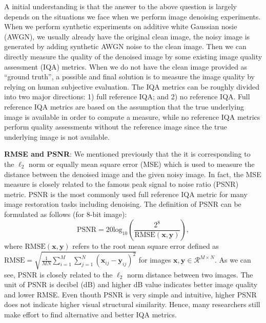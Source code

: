 A initial understanding is that the answer to the above question is largely depends on the situations we face when we perform image denoising experiments. When we perform synthetic experiments on additive white Gaussian nosie (AWGN), we usually already have the original clean image, the noisy image is generated by adding synthetic AWGN noise to the clean image. Then we can directly measure the quality of the denoised image by some existing image quality assessment (IQA) metrics. When we do not have the clean image provided as ``ground truth'', a possible and final solution is to measure the image quality by relying on human subjective evaluation. The IQA metrics can be roughly divided into two major directions: 1) full reference IQA; and 2) no reference IQA. Full reference IQA metrics are based on the assumption that the true underlying image is available in order to compute a measure, while no reference IQA metrics perform quality assessments without the reference image since the true underlying image is not available. 

\textbf{RMSE and PSNR}: We mentioned previously that the it is corresponding to the $\ell_{2}$ norm or equally mean square error (MSE) which is used to measure the distance between the denoised image and the given noisy image. In fact, the MSE measure is closely related to the famous peak signal to noise ratio (PSNR) metric. PSNR is the most commonly used full reference IQA metric for many image restoration tasks including denoising. The definition of PSNR can be formulated as follows (for 8-bit image):
\begin{equation}
\text{PSNR}
=
20\text{log}_{10}
(\frac{2^{8}}{\text{RMSE}(\bm{x},\bm{y})}),
\end{equation}
where $\text{RMSE}(\bm{x},\bm{y})$ refers to the root mean square error defined as $\text{RMSE}=\sqrt{\frac{1}{MN}\sum_{i=1}^{M}\sum_{j=1}^{N}(\bm{x}_{ij}-\bm{y}_{ij})^{2}}$ for images $\bm{x},\bm{y}\in\mathcal{R}^{M\times N}$. As we can see, PSNR is closely related to the $\ell_{2}$ norm distance between two images. The unit of PSNR is decibel (dB) and higher dB value indicates better image quality and lower RMSE. Even thouth PSNR is very simple and intuitive, higher PSNR does not indicate higher visual structural similarity. Hence, many researchers still make effort to find alternative and better IQA metrics.

